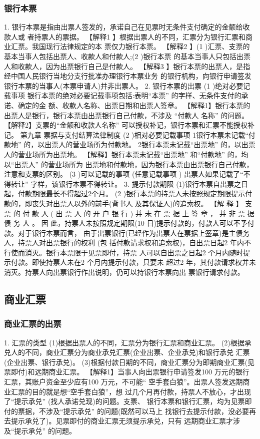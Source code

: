 \documentclass[UTF8,12pt]{ctexart}
\numberwithin{equation}{section} %
\numberwithin{figure}{section}
\numberwithin{table}{section}
\begin{document}
	\subsubsection{银行本票}
	1. 银行本票是指由出票人签发的，承诺自己在见票时无条件支付确定的金额给收款人或 者持票人的票据。
	【解释1 】根据出票人的不同，汇票分为银行汇票和商业汇票。我国现行法律规定的本 票仅力银行本票。
	【解释2 】(1 )汇票、支票的基本当事人包括出票人、收款人和付款人;(2 )银行本票 的基本当事人只包括出票人和收款人，因为出票银行自己是付款人。
	【解释3 】银行本票的出票人，是指经中国人民银行当地分支行批准办理银行本票业务 的银行机构，向银行申请签发银行本票的当事人(本票申请人)并非出票人。
	2. 银行本票的出票
	(1 )绝对必要记载事项
	银行本票的绝对必要记载事项包括:表明“本票” 的字样、无条件支付的承诺、确定的金 额、收款人名称、出票日期和出票人签章。
	【解释1】银行本票的出票人是银行，银行本票由出票银行自己付款，不涉及 “付款人 名称” 的问题。
	【解释2】支票的“金额和收款人名称” 可以授权补记，银行本票和汇票不能授权补记。
	第九章 票据与支付结算法律制度 (2 )相对必要记载事项
	1银行本票未记载“付款地” 的，以出票人的营业场所为付款地。 2银行本票未记载“出票地” 的，以出票人的营业场所为出票地。
	【解释】银行本票未记载“出票地” 和“付款地” 的，均以“出票人” 的营业场所为 出票地和付款地，因为银行本票由出票银行自己付款，注意和支票的区别。
	(3 )可以记载的事项 (任意记载事项 )
	出票人如果记载了“不得转让” 字样，该银行本票不得转让。
	3. 提示付款期限
	(1)银行本票自出票之日起，付款期限最长不得超过2个月。
	(2 )银行本票的持票人未按照规定期限提示付款的，即丧失对出票人以外的前手(背书人 及其保证人)的追索权。
	【解 释 】 支 票 的 付 款 人 ( 出 票 人 的 开 户 银 行 ) 并 未 在 票 据 上 签 章 ， 并 非 票 据 债 务 人 。 因 此，持票人未按照规定期限(10 日)提示付款的，付款人可以不予付款。对于银行本票而言， 由于出票银行(已经作为出票人在票据上签章)是主债务人，持票人对出票银行的权利 (包 括付款请求权和追索权)，自出票日起2 年内不行使而消灭。银行本票限于见票即付，持票 人可以自出票之日起2 个月内随时提示付款。即使持票人未在2 个月内提示付款，只要未 超过2 年，其付款请求权并未消灭。持票人向出票银行作出说明，仍可以持银行本票向出 票银行请求付款。
	
	
	
	\subsection{商业汇票}
	\subsubsection{商业汇票的出票} 
	1. 汇票的类型
	(1)根据出票人的不同，汇票分为银行汇票和商业汇票。 (2)根据承兑人的不同，商业汇票分为商业承兑汇票(企业出票、企业承兑)和银行承兑 汇票(企业出票、银行承兑)。 (3)根据付款日期的不同，商业汇票分为即期商业汇票(见票即付)和远期商业汇票。 【解释1】当事人向出票银行申请签发100 万元的银行汇票，其账户资金至少应有100 万元，不可能“ 空手套白狼”。出票人签发远期商业汇票的目的就是想“空手套白狼”，想 过几个月再付款，持票人不放心，才出现了“提示承兑” (找人承诺兑现)的问题。支票、 银行本票和银行汇票，均为见票即付的票据，不涉及“提示承兑” 的问题(既然可以马上 找银行去提示付款，没必要再去提示承兑了)。见票即付的商业汇票无须提示承兑，只有 远期商业汇票才涉及“提示承兑” 的问题。
	
\end{document}
